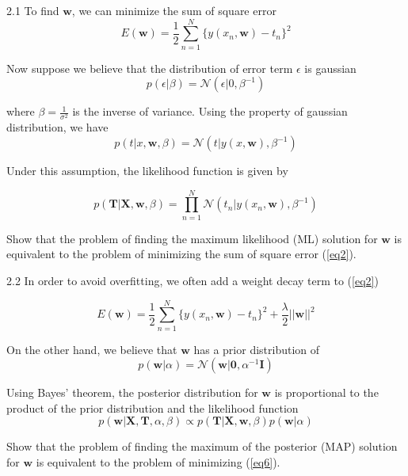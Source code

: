 \documentclass{article}
\theoremstyle{definition}
\theoremstyle{definition}
\theoremstyle{remark}
\begin{document}
2.1 To find $\bm w$, we can minimize the sum of square error
\begin{equation} \label{eq2}
E(\bm w) = \frac{1}{2}\sum_{n=1}^N\{y(x_n, \bm w)-t_n\}^2
\end{equation}

Now suppose we believe that the distribution of error term $\epsilon$ is gaussian
\begin{equation}\label{eq3}
p(\epsilon|\beta) = \mathcal N(\epsilon|0, \beta^{-1})
\end{equation}

where $\beta = \frac{1}{\sigma^2}$ is the inverse of variance. Using the property of gaussian distribution, we have
\begin{equation}\label{eq4}
p(t|x, \bm w, \beta) = \mathcal N(t|y(x, \bm w), \beta^{-1})
\end{equation}

Under this assumption, the likelihood function is given by

\begin{equation}\label{eq5}
p(\bm T|\bm X, \bm w, \beta) = \prod_{n=1}^N \mathcal N(t_n|y(x_n, \bm w), \beta^{-1})
\end{equation}

Show that the problem of finding the maximum likelihood (ML) solution for $\bm w$ is equivalent to the problem of minimizing the sum of square error (\ref{eq2}).

2.2 In order to avoid overfitting, we often add a weight decay term to (\ref{eq2})

\begin{equation}\label{eq6}
  E(\bm w) = \frac{1}{2}\sum_{n=1}^N\{y(x_n, \bm w)-t_n\}^2 + \frac{\lambda}{2}||\bm w||^2
\end{equation}

On the other hand, we believe that $\bm w$ has a prior distribution of
\begin{equation}\label{eq7}
  p(\bm w|\alpha) = \mathcal N(\bm w|\bm 0, \alpha^{-1}\bm I)
\end{equation}

Using Bayes’ theorem, the posterior distribution for $\bm w$ is proportional to the product of the prior distribution and the likelihood function
\begin{equation}\label{eq8}
  p(\bm w|\bm X, \bm T, \alpha, \beta) \propto p(\bm T|\bm X, \bm w, \beta)p(\bm w|\alpha)
\end{equation}

Show that the problem of finding the maximum of the posterior (MAP) solution for $\bm w$ is equivalent to the problem of minimizing (\ref{eq6}).
\end{document}
